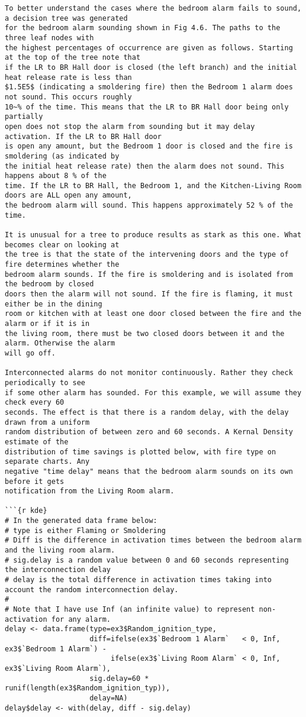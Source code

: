 \begin{lstlisting}[basicstyle=\scriptsize]
To better understand the cases where the bedroom alarm fails to sound, a decision tree was generated
for the bedroom alarm sounding shown in Fig 4.6. The paths to the three leaf nodes with
the highest percentages of occurrence are given as follows. Starting at the top of the tree note that
if the LR to BR Hall door is closed (the left branch) and the initial heat release rate is less than
$1.5E5$ (indicating a smoldering fire) then the Bedroom 1 alarm does not sound. This occurs roughly
10~% of the time. This means that the LR to BR Hall door being only partially
open does not stop the alarm from sounding but it may delay activation. If the LR to BR Hall door
is open any amount, but the Bedroom 1 door is closed and the fire is smoldering (as indicated by
the initial heat release rate) then the alarm does not sound. This happens about 8 % of the
time. If the LR to BR Hall, the Bedroom 1, and the Kitchen-Living Room doors are ALL open any amount,
the bedroom alarm will sound. This happens approximately 52 % of the time.

It is unusual for a tree to produce results as stark as this one. What becomes clear on looking at
the tree is that the state of the intervening doors and the type of fire determines whether the
bedroom alarm sounds. If the fire is smoldering and is isolated from the bedroom by closed
doors then the alarm will not sound. If the fire is flaming, it must either be in the dining
room or kitchen with at least one door closed between the fire and the alarm or if it is in
the living room, there must be two closed doors between it and the alarm. Otherwise the alarm
will go off.

Interconnected alarms do not monitor continuously. Rather they check periodically to see
if some other alarm has sounded. For this example, we will assume they check every 60
seconds. The effect is that there is a random delay, with the delay drawn from a uniform
random distribution of between zero and 60 seconds. A Kernal Density estimate of the
distribution of time savings is plotted below, with fire type on separate charts. Any
negative "time delay" means that the bedroom alarm sounds on its own before it gets
notification from the Living Room alarm.

```{r kde}
# In the generated data frame below:
# type is either Flaming or Smoldering
# Diff is the difference in activation times between the bedroom alarm and the living room alarm.
# sig.delay is a random value between 0 and 60 seconds representing the interconnection delay
# delay is the total difference in activation times taking into account the random interconnection delay.
#
# Note that I have use Inf (an infinite value) to represent non-activation for any alarm.
delay <- data.frame(type=ex3$Random_ignition_type,
                    diff=ifelse(ex3$`Bedroom 1 Alarm`   < 0, Inf, ex3$`Bedroom 1 Alarm`) -
                         ifelse(ex3$`Living Room Alarm` < 0, Inf, ex3$`Living Room Alarm`),
                    sig.delay=60 * runif(length(ex3$Random_ignition_typ)),
                    delay=NA)
delay$delay <- with(delay, diff - sig.delay)


\end{lstlisting}
